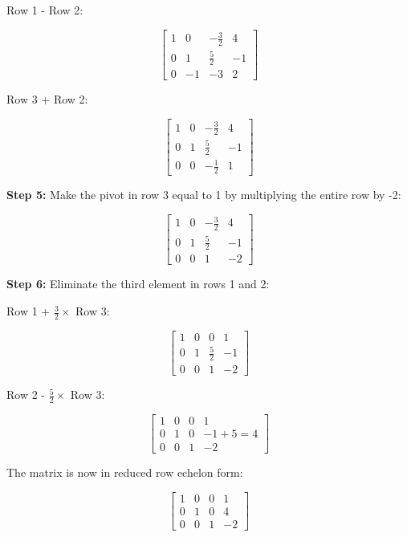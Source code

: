 Row 1 - Row 2:

\[
    \left[
    \begin{array}{ccc|c}
        1 & 0  & -\frac{3}{2} & 4  \\
        0 & 1  & \frac{5}{2}  & -1 \\
        0 & -1 & -3           & 2
    \end{array}
    \right]
\]

Row 3 + Row 2:

\[
    \left[
    \begin{array}{ccc|c}
        1 & 0 & -\frac{3}{2} & 4  \\
        0 & 1 & \frac{5}{2}  & -1 \\
        0 & 0 & -\frac{1}{2} & 1
    \end{array}
    \right]
\]

\textbf{Step 5:} Make the pivot in row 3 equal to 1 by multiplying the entire row by -2:

\[
    \left[
    \begin{array}{ccc|c}
        1 & 0 & -\frac{3}{2} & 4  \\
        0 & 1 & \frac{5}{2}  & -1 \\
        0 & 0 & 1            & -2
    \end{array}
    \right]
\]

\textbf{Step 6:} Eliminate the third element in rows 1 and 2:

Row 1 + \(\frac{3}{2} \times\) Row 3:

\[
    \left[
    \begin{array}{ccc|c}
        1 & 0 & 0           & 1  \\
        0 & 1 & \frac{5}{2} & -1 \\
        0 & 0 & 1           & -2
    \end{array}
    \right]
\]

Row 2 - \(\frac{5}{2} \times\) Row 3:

\[
    \left[
    \begin{array}{ccc|c}
        1 & 0 & 0 & 1          \\
        0 & 1 & 0 & -1 + 5 = 4 \\
        0 & 0 & 1 & -2
    \end{array}
    \right]
\]

The matrix is now in reduced row echelon form:

\[
    \left[
    \begin{array}{ccc|c}
        1 & 0 & 0 & 1  \\
        0 & 1 & 0 & 4  \\
        0 & 0 & 1 & -2
    \end{array}
    \right]
\]

